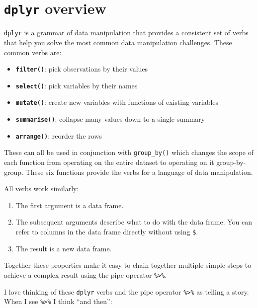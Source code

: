 \documentclass[]{book}
\newenvironment{Shaded}{\begin{snugshade}}{\end{snugshade}}
\newcommand{\CommentTok}[1]{\textcolor[rgb]{0.56,0.35,0.01}{\textit{#1}}}
\newcommand{\KeywordTok}[1]{\textcolor[rgb]{0.13,0.29,0.53}{\textbf{#1}}}
\newcommand{\NormalTok}[1]{#1}
\newcommand{\OperatorTok}[1]{\textcolor[rgb]{0.81,0.36,0.00}{\textbf{#1}}}
\newcommand{\StringTok}[1]{\textcolor[rgb]{0.31,0.60,0.02}{#1}}
\providecommand{\tightlist}{%
  \setlength{\itemsep}{0pt}\setlength{\parskip}{0pt}}
\begin{document}
\hypertarget{dplyr-overview}{%
\section{\texorpdfstring{\texttt{dplyr} overview}{dplyr overview}}\label{dplyr-overview}}

\texttt{dplyr} is a grammar of data manipulation that provides a consistent set of verbs that help you solve the most common data manipulation challenges. These common verbs are:

\begin{itemize}
\item
  \textbf{\texttt{filter()}}: pick observations by their values
\item
  \textbf{\texttt{select()}}: pick variables by their names
\item
  \textbf{\texttt{mutate()}}: create new variables with functions of existing variables
\item
  \textbf{\texttt{summarise()}}: collapse many values down to a single summary
\item
  \textbf{\texttt{arrange()}}: reorder the rows
\end{itemize}

These can all be used in conjunction with \texttt{group\_by()} which changes the scope of each function from operating on the entire dataset to operating on it group-by-group. These six functions provide the verbs for a language of data manipulation.

All verbs work similarly:

\begin{enumerate}
\def\labelenumi{\arabic{enumi}.}
\tightlist
\item
  The first argument is a data frame.
\item
  The subsequent arguments describe what to do with the data frame. You can refer to columns in the data frame directly without using \texttt{\$}.
\item
  The result is a new data frame.
\end{enumerate}

Together these properties make it easy to chain together multiple simple steps to achieve a complex result using the pipe operator \texttt{\%\textgreater{}\%}.

I love thinking of these \texttt{dplyr} verbs and the pipe operator \texttt{\%\textgreater{}\%} as telling a story. When I see \texttt{\%\textgreater{}\%} I think ``and then'':

\begin{Shaded}
\end{Shaded}
\end{document}
